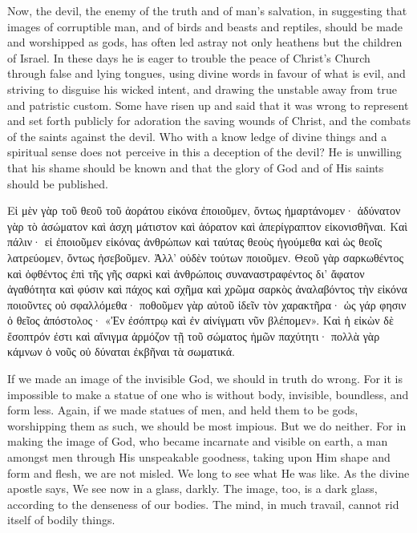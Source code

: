 \documentclass[10pt]{book}
\newcommand{\switchgreek}[1][]{\selectlanguage{polutonikogreek} \switchcolumn*[#1]}
\newcommand{\switchenglish}{\selectlanguage{english} \switchcolumn}
\begin{document}
\begin{paracol}{2}
Now, the devil, the enemy of the 
truth and of man's salvation, in suggesting 
that images of corruptible man, and of birds 
and beasts and reptiles, should be made and 
worshipped as gods, has often led astray not 
only heathens but the children of Israel. In 
these days he is eager to trouble the peace 
of Christ's Church through false and lying 
tongues, using divine words in favour of what 
is evil, and striving to disguise his wicked 
intent, and drawing the unstable away from 
true and patristic custom. Some have risen 
up and said that it was wrong to represent 
and set forth publicly for adoration the saving 
wounds of Christ, and the combats of the 
saints against the devil. Who with a know 
ledge of divine things and a spiritual sense 
does not perceive in this a deception of the 
devil? He is unwilling that his shame 
should be known and that the glory of God 
and of His saints should be published.

\switchgreek

Εἰ μὲν γὰρ τοῦ θεοῦ τοῦ ἀοράτου εἰκόνα ἐποιοῦμεν, ὄντως ἡμαρτάνομεν· ἀδύνατον
γὰρ τὸ ἀσώματον καὶ ἀσχη μάτιστον καὶ ἀόρατον καὶ ἀπερίγραπτον εἰκονισθῆναι.
Καὶ πάλιν· εἰ ἐποιοῦμεν εἰκόνας ἀνθρώπων καὶ ταύτας θεοὺς ἡγούμεθα καὶ ὡς
θεοῖς λατρεύομεν, ὄντως ἠσεβοῦμεν. Ἀλλ’ οὐδὲν τούτων ποιοῦμεν. Θεοῦ γὰρ
σαρκωθέντος καὶ ὀφθέντος ἐπὶ τῆς γῆς σαρκὶ καὶ ἀνθρώποις συναναστραφέντος δι’
ἄφατον ἀγαθότητα καὶ φύσιν καὶ πάχος καὶ σχῆμα καὶ χρῶμα σαρκὸς ἀναλαβόντος
τὴν εἰκόνα ποιοῦντες οὐ σφαλλόμεθα· ποθοῦμεν γὰρ αὐτοῦ ἰδεῖν τὸν χαρακτῆρα·
ὡς γάρ φησιν ὁ θεῖος ἀπόστολος· «Ἐν ἐσόπτρῳ καὶ ἐν αἰνίγματι νῦν βλέπομεν».
Καὶ ἡ εἰκὼν δὲ ἔσοπτρόν ἐστι καὶ αἴνιγμα ἁρμόζον τῇ τοῦ σώματος ἡμῶν
παχύτητι· πολλὰ γὰρ κάμνων ὁ νοῦς οὐ δύναται ἐκβῆναι τὰ σωματικά.

\switchenglish

If we made an image of the invisible God, 
we should in truth do wrong. For it is 
impossible to make a statue of one who is 
without body, invisible, boundless, and form 
less. Again, if we made statues of men, and 
held them to be gods, worshipping them as 
such, we should be most impious. But we 
do neither. For in making the image of God, 
who became incarnate and visible on earth, 
a man amongst men through His unspeakable 
goodness, taking upon Him shape and form 
and flesh, we are not misled. We long to see 
what He was like. As the divine apostle 
says, We see now in a glass, darkly. The 
image, too, is a dark glass, according to the 
denseness of our bodies. The mind, in much 
travail, cannot rid itself of bodily things. 


\end{paracol}
\end{document}
